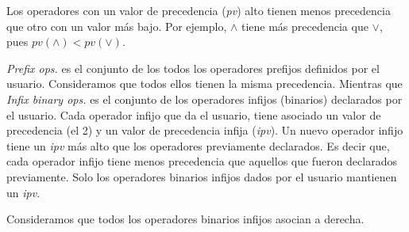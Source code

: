 \documentclass[a4paper,11pt]{article}
\theoremstyle{definition}
\begin{document}
Los operadores con un valor de precedencia (\textit{pv}) alto tienen menos precedencia que otro con un valor más bajo.
Por ejemplo, $\wedge$ tiene más precedencia que $\vee$, pues $pv (\wedge) < pv (\vee)$.

\textit{Prefix ops.} es el conjunto de los todos los operadores prefijos definidos por el usuario. Consideramos
que todos ellos tienen la misma precedencia.
Mientras que \textit{Infix binary ops.} es el conjunto de los operadores infijos (binarios) declarados por el usuario.
Cada operador infijo que da el usuario, tiene asociado un valor de precedencia (el 2) y un valor de precedencia infija (\textit{ipv}).
Un nuevo operador infijo tiene un \textit{ipv} más alto que los operadores previamente declarados.
Es decir que, cada operador infijo tiene menos precedencia que aquellos que fueron declarados previamente.
Solo los operadores binarios infijos dados por el usuario mantienen un \textit{ipv}.

Consideramos que todos los operadores binarios infijos asocian a derecha.
\end{document}
